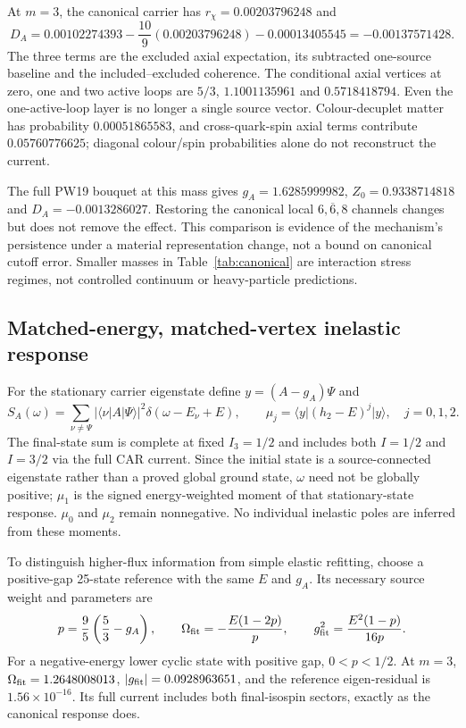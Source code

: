 \documentclass[11pt]{article}
\newcommand{\ket}[1]{\lvert #1\rangle}
\newcommand{\bra}[1]{\langle #1\rvert}
\begin{document}
\CanonicalTable
At $m=3$, the canonical carrier has $r_\chi=0.00203796248$ and
\begin{equation}
 D_A=0.00102274393-\frac{10}{9}(0.00203796248)-0.00013405545
 =-0.00137571428.
\end{equation}
The three terms are the excluded axial expectation, its subtracted one-source baseline and the included--excluded coherence. The conditional axial vertices at zero, one and two active loops are $5/3$, $1.1001135961$ and $0.5718418794$. Even the one-active-loop layer is no longer a single source vector. Colour-decuplet matter has probability $0.00051865583$, and cross-quark-spin axial terms contribute $0.05760776625$; diagonal colour/spin probabilities alone do not reconstruct the current.

The full PW19 bouquet at this mass gives $g_A=1.6285999982$, $Z_0=0.9338714818$ and $D_A=-0.0013286027$. Restoring the canonical local $6,\overline6,8$ channels changes but does not remove the effect. This comparison is evidence of the mechanism's persistence under a material representation change, not a bound on canonical cutoff error. Smaller masses in Table~\ref{tab:canonical} are interaction stress regimes, not controlled continuum or heavy-particle predictions.

\subsection{Matched-energy, matched-vertex inelastic response}
For the stationary carrier eigenstate define $y=(A-g_A)\Psi$ and
\begin{equation}
 S_A(\omega)=\sum_{\nu\ne\Psi}|\bra\nu A\ket\Psi|^2
           \delta(\omega-E_\nu+E),\qquad
 \mu_j=\bra y(h_2-E)^j\ket y,\quad j=0,1,2. \label{eq:moments}
\end{equation}
The final-state sum is complete at fixed $I_3=1/2$ and includes both $I=1/2$ and $I=3/2$ via the full CAR current. Since the initial state is a source-connected eigenstate rather than a proved global ground state, $\omega$ need not be globally positive; $\mu_1$ is the signed energy-weighted moment of that stationary-state response. $\mu_0$ and $\mu_2$ remain nonnegative. No individual inelastic poles are inferred from these moments.

To distinguish higher-flux information from simple elastic refitting, choose a positive-gap 25-state reference with the same $E$ and $g_A$. Its necessary source weight and parameters are
\begin{equation}
 p=\frac95\left(\frac53-g_A\right),\qquad
 \Omega_{\rm fit}=-\frac{E(1-2p)}p,\qquad
 g_{\rm fit}^2=\frac{E^2(1-p)}{16p}. \label{eq:fit}
\end{equation}
For a negative-energy lower cyclic state with positive gap, $0<p<1/2$. At $m=3$, $\Omega_{\rm fit}=1.2648008013$, $|g_{\rm fit}|=0.0928963651$, and the reference eigen-residual is $1.56\times10^{-16}$. Its full current includes both final-isospin sectors, exactly as the canonical response does.
\end{document}
